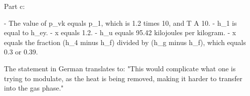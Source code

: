 Part c:

- The value of p_vk equals p_1, which is 1.2 times 10, and T A 10.
- h_1 is equal to h_ey.
- x equals 1.2.
- h_u equals 95.42 kilojoules per kilogram.
- x equals the fraction (h_4 minus h_f) divided by (h_g minus h_f), which equals 0.3 or 0.39.

The statement in German translates to: "This would complicate what one is trying to modulate, as the heat is being removed, making it harder to transfer into the gas phase."